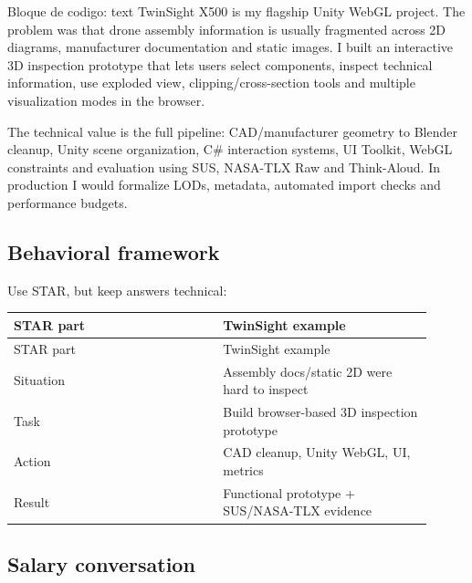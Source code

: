 \begin{mdcode}
Bloque de codigo: text
TwinSight X500 is my flagship Unity WebGL project. The problem was that drone assembly information is usually fragmented across 2D diagrams, manufacturer documentation and static images. I built an interactive 3D inspection prototype that lets users select components, inspect technical information, use exploded view, clipping/cross-section tools and multiple visualization modes in the browser.

The technical value is the full pipeline: CAD/manufacturer geometry to Blender cleanup, Unity scene organization, C# interaction systems, UI Toolkit, WebGL constraints and evaluation using SUS, NASA-TLX Raw and Think-Aloud. In production I would formalize LODs, metadata, automated import checks and performance budgets.
\end{mdcode}


\subsection{Behavioral framework}


Use STAR, but keep answers technical:


\begin{center}
\scriptsize
\begin{longtable}{>{\raggedright\arraybackslash}p{0.455\linewidth} >{\raggedright\arraybackslash}p{0.455\linewidth}}
\toprule
STAR part & TwinSight example \\
\midrule
\endfirsthead
\toprule
STAR part & TwinSight example \\
\midrule
\endhead
Situation & Assembly docs/static 2D were hard to inspect \\
Task & Build browser-based 3D inspection prototype \\
Action & CAD cleanup, Unity WebGL, UI, metrics \\
Result & Functional prototype + SUS/NASA-TLX evidence \\
\bottomrule
\end{longtable}
\end{center}


\subsection{Salary conversation}


